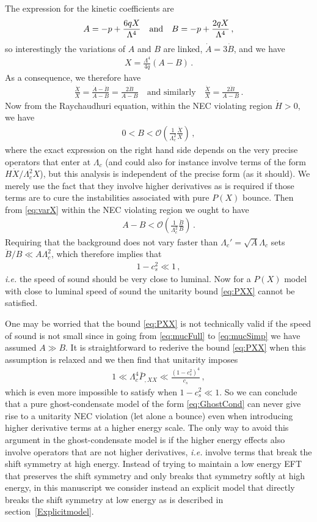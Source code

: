 \documentclass[12pt]{article}
\def\ba{\begin{eqnarray}}
\def\ea{\end{eqnarray}}
\def\({\left(}
\def\){\right)}
\def\ie{{\it i.e. }}
\begin{document}
The expression for the kinetic coefficients are
\ba
A = -p + \frac{6q X }{\Lambda^4} \quad{\rm and }\quad B = -p  + \frac{2q X }{\Lambda^4}\,,
\ea
so interestingly the variations of $A$ and $B$ are linked, $\dot A = 3\dot B$, and we have
\ba
X=\frac{\Lambda^4}{4q}(A-B)\,.
\ea
As a consequence, we therefore have
\ba
\label{eq:varX}
\frac{\dot X}{ X}=\frac{\dot A -\dot B }{A-B} = \frac{2 \dot B}{A-B}\quad\text{and similarly}\quad
\frac{\ddot X}{ X} = \frac{2 \ddot B}{A-B}\,.
\ea
Now from the Raychaudhuri equation, within the NEC violating region $\dot H>0$, we have
\ba
0< B < \mathcal{O}\(\frac{1}{\Lambda_c^2}\frac{\ddot X }{ X}\)\,,
\ea
where the exact expression on the right hand side depends on the very precise operators that enter at $\Lambda_c$ (and could also for instance involve terms of the form $H \dot X/ \Lambda_c^2 X $),  but this analysis is independent of the precise form (as it should). We merely use the fact that they involve higher derivatives as is required if those terms are to cure the instabilities associated with pure $P(X)$ bounce. Then from \eqref{eq:varX} within the NEC violating region we ought to have
\ba
 A-B < \mathcal{O}\(\frac{1}{\Lambda_c^2}\frac{\ddot B }{ B}\)\,.
\ea
Requiring that the background does not vary faster than $\Lambda_c'=\sqrt{A}\Lambda_c$ sets $\ddot B / B \ll A \Lambda_c^2$, which therefore implies that
\ba
 1-c^2_s \ll 1\,,
\ea
\ie the speed of sound should be very close to luminal. Now for a $P(X)$ model with close to luminal speed of sound the unitarity bound \eqref{eq:PXX} cannot be satisfied.

One may be worried that the bound \eqref{eq:PXX} is not technically valid if the speed of sound is not small since in going from \eqref{eq:mucFull} to \eqref{eq:mucSimp} we have assumed $A\gg B$. It is straightforward to rederive the bound \eqref{eq:PXX} when this assumption is relaxed and we then find that unitarity imposes
\ba
1\ll \Lambda_c^4 \bar P_{, XX} \ll \frac{(1-c_s^2)^4}{c_s}\,,
\ea
which is even more impossible to satisfy when $ 1-c^2_s \ll 1$. So we can conclude that a pure ghost-condensate model of the form \eqref{eq:GhostCond} can never give rise to a unitarity NEC violation (let alone a bounce) even when introducing higher derivative terms at a higher energy scale. The only way to avoid this argument in the ghost-condensate model is if the higher energy effects also involve operators that are not higher derivatives, \ie involve terms that break the shift symmetry at high energy. Instead of trying to maintain a low energy EFT that preserves the shift symmetry and only breaks that symmetry softly at high energy, in this manuscript we consider instead an explicit model that directly breaks the shift symmetry at low energy as is described in section~\ref{Explicitmodel}.


\newpage



\end{document}
